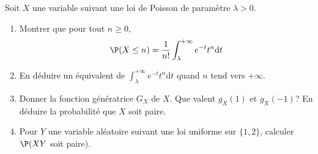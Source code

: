 \documentclass[a4paper,twoside,french,11pt]{VcCours}
\newcommand{\dt}{\text{d}t}
\begin{document}
\begin{Exercice}{}
Soit $X$ une variable suivant une loi de Poisson de paramètre $\lambda>0$. 
\begin{enumerate}
\item Montrer que pour tout $n \geq 0$,
$$ \P(X \leq n) = \dfrac{1}{n!} \int_{\lambda}^{+ \infty} e^{-t} t^n \dt$$
\item En déduire un équivalent de $\int_{\lambda}^{+ \infty} e^{-t} t^n \dt$ quand $n$ tend vers $+ \infty$.
\item Donner la fonction génératrice $G_X$ de $X$. Que valent $g_X(1)$ et $g_X(-1)$? En déduire la probabilité que $X$ soit paire.
\item Pour $Y$ une variable aléatoire suivant une loi uniforme sur $\lbrace 1,2 \rbrace$, calculer $\P(XY$ soit paire).
\end{enumerate}
\end{Exercice}
\end{document}
